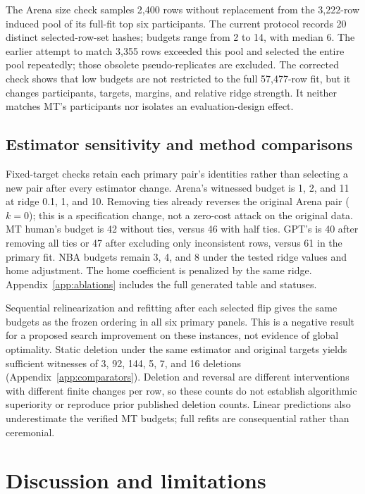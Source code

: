 \documentclass{article}
\begin{document}
The Arena size check samples 2,400 rows without replacement from the 3,222-row induced pool of its full-fit top six participants. The current protocol records 20 distinct selected-row-set hashes; budgets range from 2 to 14, with median 6. The earlier attempt to match 3,355 rows exceeded this pool and selected the entire pool repeatedly; those obsolete pseudo-replicates are excluded. The corrected check shows that low budgets are not restricted to the full 57,477-row fit, but it changes participants, targets, margins, and relative ridge strength. It neither matches MT's participants nor isolates an evaluation-design effect.

\subsection{Estimator sensitivity and method comparisons}
\label{sec:sensitivity}
Fixed-target checks retain each primary pair's identities rather than selecting a new pair after every estimator change. Arena's witnessed budget is 1, 2, and 11 at ridge 0.1, 1, and 10. Removing ties already reverses the original Arena pair ($k=0$); this is a specification change, not a zero-cost attack on the original data. MT human's budget is 42 without ties, versus 46 with half ties. GPT's is 40 after removing all ties or 47 after excluding only inconsistent rows, versus 61 in the primary fit. NBA budgets remain 3, 4, and 8 under the tested ridge values and home adjustment. The home coefficient is penalized by the same ridge. Appendix~\ref{app:ablations} includes the full generated table and statuses.

Sequential relinearization and refitting after each selected flip gives the same budgets as the frozen ordering in all six primary panels. This is a negative result for a proposed search improvement on these instances, not evidence of global optimality. Static deletion under the same estimator and original targets yields sufficient witnesses of 3, 92, 144, 5, 7, and 16 deletions (Appendix~\ref{app:comparators}). Deletion and reversal are different interventions with different finite changes per row, so these counts do not establish algorithmic superiority or reproduce prior published deletion counts. Linear predictions also underestimate the verified MT budgets; full refits are consequential rather than ceremonial.

\section{Discussion and limitations}
\label{sec:discussion}
\end{document}
